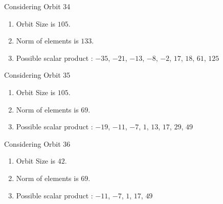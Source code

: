 \documentclass[12pt]{article}
\begin{document}
Considering Orbit 34
\begin{enumerate}
\item Orbit Size is $105$.
\item Norm of elements is $133$.
\item Possible scalar product : $-35$, $-21$, $-13$, $-8$, $-2$, $17$, $18$, $61$, $125$
\end{enumerate}
Considering Orbit 35
\begin{enumerate}
\item Orbit Size is $105$.
\item Norm of elements is $69$.
\item Possible scalar product : $-19$, $-11$, $-7$, $1$, $13$, $17$, $29$, $49$
\end{enumerate}
Considering Orbit 36
\begin{enumerate}
\item Orbit Size is $42$.
\item Norm of elements is $69$.
\item Possible scalar product : $-11$, $-7$, $1$, $17$, $49$
\end{enumerate}
\end{document}
